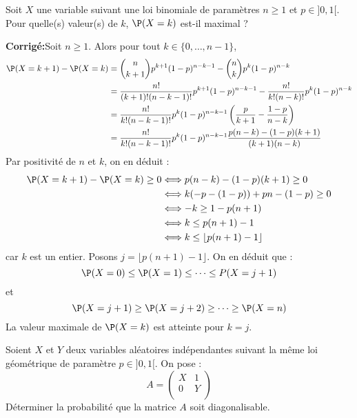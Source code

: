 \documentclass[a4paper,twoside,french,11pt]{VcCours}
\newcommand{\corr}{\textbf{Corrigé:}}
\begin{document}
\begin{Exercice}{} Soit $X$ une variable suivant une loi binomiale de paramètres $n \geq 1$ et $p \in ]0,1[$. Pour quelle(s) valeur(s) de $k$, $\P(X=k)$ est-il maximal ?
\end{Exercice}

\corr Soit $n \geq 1$. Alors pour tout $k \in \lbrace 0, \ldots, n-1\rbrace$,
\begin{align*}
\P(X=k+1)- \P(X=k) & = \binom{n}{k+1} p^{k+1} (1-p)^{n-k-1} - \binom{n}{k} p^{k} (1-p)^{n-k} \\
& = \dfrac{n!}{(k+1)!(n-k-1)!} p^{k+1} (1-p)^{n-k-1} - \dfrac{n!}{k!(n-k)!}  p^{k} (1-p)^{n-k} \\
& = \dfrac{n!}{k! (n-k-1)!} p^k(1-p)^{n-k-1} \left( \dfrac{p}{k+1} - \dfrac{1-p}{n-k} \right) \\
& =  \dfrac{n!}{k! (n-k-1)!} p^k(1-p)^{n-k-1} \dfrac{p(n-k)- (1-p)(k+1)}{(k+1)(n-k)}
\end{align*}
Par positivité de $n$ et $k$, on en déduit :
\begin{align*}
\P(X=k+1)- \P(X=k) \geq 0 & \Longleftrightarrow p(n-k)- (1-p)(k+1) \geq 0 \\
& \Longleftrightarrow k (-p-(1-p)) + pn -(1-p) \geq 0 \\
& \Longleftrightarrow -k \geq 1-p(n+1) \\
& \Longleftrightarrow k \leq p(n+1)-1 \\
& \Longleftrightarrow k \leq \lfloor  p(n+1)-1 \rfloor
\end{align*}
car $k$ est un entier. Posons $j= \lfloor  p(n+1)-1 \rfloor$. On en déduit que :
$$ \P(X=0) \leq \P(X=1) \leq \cdots \leq P(X=j+1)$$
et 
$$ \P(X=j+1) \geq \P(X=j+2) \geq \cdots \geq \P(X=n)$$
La valeur maximale de $\P(X=k)$ est atteinte pour $k=j$.

\begin{Exercice}{} Soient $X$ et $Y$ deux variables aléatoires indépendantes suivant la même loi géométrique de paramètre $p \in ]0,1[$. On pose :
$$ A = \begin{pmatrix}
X & 1 \\
0 & Y \\
\end{pmatrix}$$
Déterminer la probabilité que la matrice $A$ soit diagonalisable.
\end{Exercice} 
\end{document}
